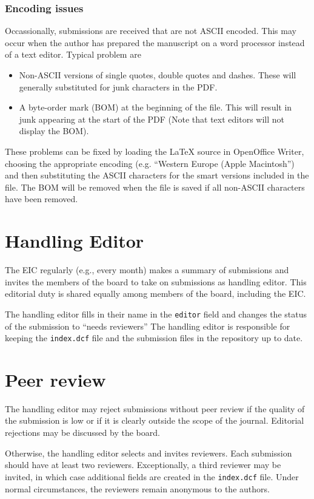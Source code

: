 \documentclass[11pt]{article}
\begin{document}
\subsubsection{Encoding issues}

Occassionally, submissions are received that are not ASCII encoded.
This may occur when the author has prepared the manuscript on a word
processor instead of a text editor. Typical problem are
\begin{itemize}
\item Non-ASCII versions of single quotes, double quotes and dashes.
  These will generally substituted for junk characters in the PDF.
\item A byte-order mark (BOM) at the beginning of the file. This will
  result in junk appearing at the start of the PDF (Note that text
  editors will not display the BOM).
\end{itemize}
These problems can be fixed by loading the LaTeX source in OpenOffice
Writer, choosing the appropriate encoding (e.g. ``Western Europe (Apple
Macintosh'') and then substituting the ASCII characters for the
smart versions included in the file. The BOM will be removed when
the file is saved if all non-ASCII characters have been removed.

\section{Handling Editor}

The EIC regularly (e.g., every month) makes a summary of submissions
and invites the members of the board to take on submissions as
handling editor. This editorial duty is shared equally among members
of the board, including the EIC.

The handling editor fills in their name in the \texttt{editor} field
and changes the status of the submission to ``needs reviewers'' The
handling editor is responsible for keeping the \texttt{index.dcf} file
and the submission files in the repository up to date.

\section{Peer review}

The handling editor may reject submissions without peer review if the
quality of the submission is low or if it is clearly outside the scope
of the journal. Editorial rejections may be discussed by the board.

Otherwise, the handling editor selects and invites reviewers. Each
submission should have at least two reviewers. Exceptionally, a third
reviewer may be invited, in which case additional fields are created
in the \texttt{index.dcf} file. Under normal circumstances, the
reviewers remain anonymous to the authors.
\end{document}
